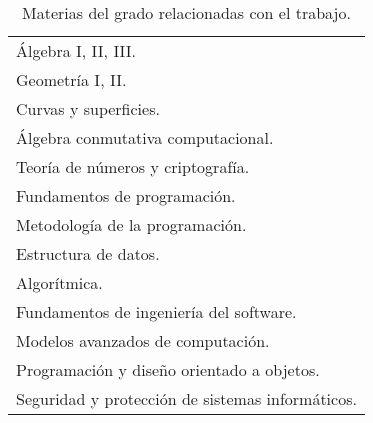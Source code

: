 \begin{table}[p]
  \myfloatalign
  \begin{tabularx}{\textwidth}{X} \toprule
    Álgebra I, II, III. \\
    Geometría I, II. \\
    Curvas y superficies. \\
    Álgebra conmutativa computacional. \\
    Teoría de números y criptografía. \\

    Fundamentos de programación. \\
    Metodología de la programación. \\
    Estructura de datos. \\
    Algorítmica. \\
    Fundamentos de ingeniería del software. \\
    Modelos avanzados de computación. \\
    Programación y diseño orientado a objetos. \\
    Seguridad y protección de sistemas informáticos. \\
    \bottomrule
  \end{tabularx}
  \caption{Materias del grado relacionadas con el trabajo.}\label{tab:Asignaturas más relevantes}
\end{table}

